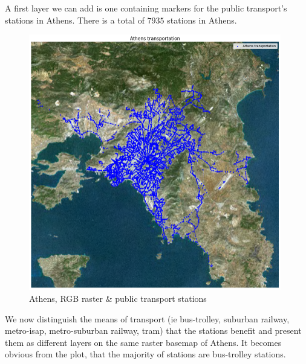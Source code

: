 A first layer we can add is one containing markers for the public transport's stations in Athens. There is a total of $7935$ stations in Athens.

\begin{figure}[h]
    \centering
    \includegraphics[width=11cm]{figures/q3_2_athens_oasa.png}
    \caption{Athens, RGB raster & public transport stations}
    \label{fig:Athens, RGB raster & public transport stations}
\end{figure}
\FloatBarrier %

We now distinguish the means of transport (ie bus-trolley, suburban railway, metro-isap, metro-suburban railway, tram) that the stations benefit and present them as different layers on the same raster basemap of Athens. It becomes obvious from the plot, that the majority of stations are bus-trolley stations.

